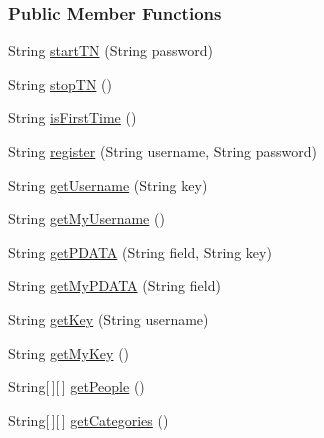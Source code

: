 \subsubsection*{Public Member Functions}
\begin{DoxyCompactItemize}
\item 
String \hyperlink{interfaceballmerpeak_1_1turtlenet_1_1client_1_1Turtlenet_ad2c185cc33495082c8da75b56de3923d}{start\-T\-N} (String password)
\item 
String \hyperlink{interfaceballmerpeak_1_1turtlenet_1_1client_1_1Turtlenet_ab9c5f257cca5e02901ffd588965963be}{stop\-T\-N} ()
\item 
String \hyperlink{interfaceballmerpeak_1_1turtlenet_1_1client_1_1Turtlenet_af9208c1d9cb46ce3470a33df4a1a4df9}{is\-First\-Time} ()
\item 
String \hyperlink{interfaceballmerpeak_1_1turtlenet_1_1client_1_1Turtlenet_ad64cfc9925dcd72033616bbdb04949a0}{register} (String username, String password)
\item 
String \hyperlink{interfaceballmerpeak_1_1turtlenet_1_1client_1_1Turtlenet_a7be22b6c4de115ee3842215390327a01}{get\-Username} (String key)
\item 
String \hyperlink{interfaceballmerpeak_1_1turtlenet_1_1client_1_1Turtlenet_a1403ccfe05dbc6d8c1634b9ee495db15}{get\-My\-Username} ()
\item 
String \hyperlink{interfaceballmerpeak_1_1turtlenet_1_1client_1_1Turtlenet_ad8ee0ed3492a6014119f93e924f7e08c}{get\-P\-D\-A\-T\-A} (String field, String key)
\item 
String \hyperlink{interfaceballmerpeak_1_1turtlenet_1_1client_1_1Turtlenet_a6e1aec0d0b894cc034a058e6a1e59f8d}{get\-My\-P\-D\-A\-T\-A} (String field)
\item 
String \hyperlink{interfaceballmerpeak_1_1turtlenet_1_1client_1_1Turtlenet_a1e027a6781273a6004088c007652bbfb}{get\-Key} (String username)
\item 
String \hyperlink{interfaceballmerpeak_1_1turtlenet_1_1client_1_1Turtlenet_a92f271e68b3fe28daaff65852546f0b7}{get\-My\-Key} ()
\item 
String\mbox{[}$\,$\mbox{]}\mbox{[}$\,$\mbox{]} \hyperlink{interfaceballmerpeak_1_1turtlenet_1_1client_1_1Turtlenet_ac9f6b1c3381cbfe692ec418c5a20de72}{get\-People} ()
\item 
String\mbox{[}$\,$\mbox{]}\mbox{[}$\,$\mbox{]} \hyperlink{interfaceballmerpeak_1_1turtlenet_1_1client_1_1Turtlenet_a1576427e28630ba76693f57bb6c6e8e5}{get\-Categories} ()
\item 

\end{DoxyCompactItemize}
